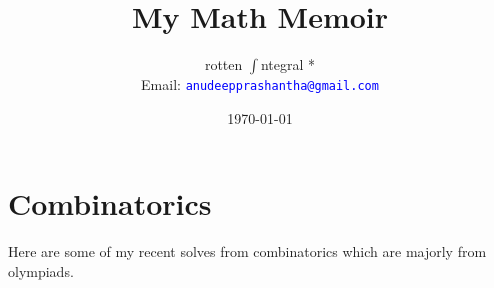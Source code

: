 \documentclass[a4paper, 11pt]{book}
\title{\textbf{My Math Memoir}}
\author{rotten $\int$ntegral *\\Email: \textcolor{blue}{\texttt{anudeepprashantha@gmail.com}}}
\date{\today}
\begin{document}
\maketitle
    \tableofcontents

	\chapter{Combinatorics}
	\noindent Here are some of my recent solves from combinatorics which are majorly from olympiads. 
	
	
\end{document}
